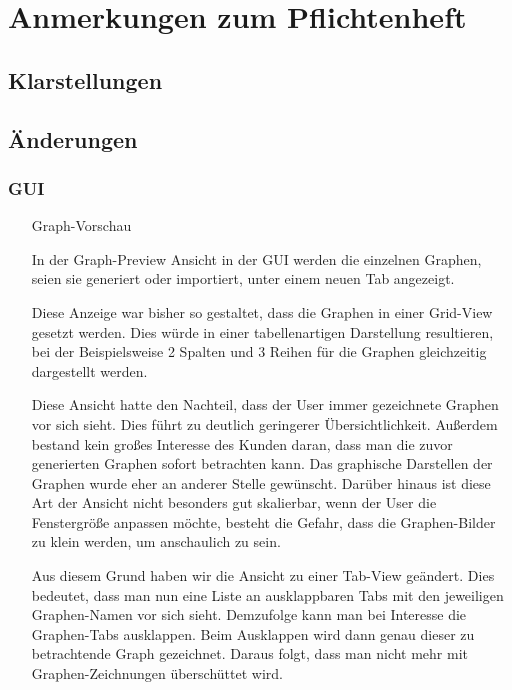 \documentclass{article}
\begin{document}
	\section{Anmerkungen zum Pflichtenheft}
		\subsection{Klarstellungen}
		
		\subsection{Änderungen}
			\subsubsection{GUI}
			\begin{enumerate}
			\item[Graph-Vorschau]{
				In der Graph-Preview Ansicht in der GUI werden die einzelnen Graphen, seien sie generiert oder importiert, unter einem neuen Tab angezeigt.
				
				Diese Anzeige war bisher so gestaltet, dass die Graphen in einer Grid-View gesetzt werden.
				Dies würde in einer tabellenartigen Darstellung resultieren, bei der Beispielsweise 2 Spalten und 3 Reihen für die Graphen gleichzeitig dargestellt werden.
				
				Diese Ansicht hatte den Nachteil, dass der User immer gezeichnete Graphen vor sich sieht.
				Dies führt zu deutlich geringerer Übersichtlichkeit.
				Außerdem bestand kein großes Interesse des Kunden daran, dass man die zuvor generierten Graphen sofort betrachten kann.
					Das graphische Darstellen der Graphen wurde eher an anderer Stelle gewünscht.
				Darüber hinaus ist diese Art der Ansicht nicht besonders gut skalierbar, wenn der User die Fenstergröße anpassen möchte, besteht die Gefahr, dass die Graphen-Bilder zu klein werden, um anschaulich zu sein.
				
				Aus diesem Grund haben wir die Ansicht zu einer Tab-View geändert.
				Dies bedeutet, dass man nun eine Liste an ausklappbaren Tabs mit den jeweiligen Graphen-Namen vor sich sieht.
				Demzufolge kann man bei Interesse die Graphen-Tabs ausklappen.
					Beim Ausklappen wird dann genau dieser zu betrachtende Graph gezeichnet.
					Daraus folgt, dass man nicht mehr mit Graphen-Zeichnungen überschüttet wird.
				
}
\end{enumerate}
\end{document}
